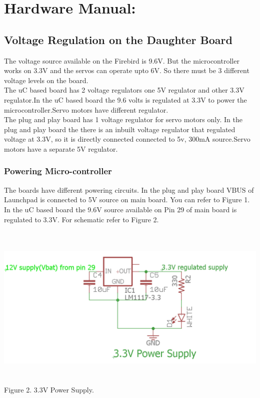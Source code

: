\documentclass[a4paper,10pt,oneside]{article}
\begin{document}
{		
		
	\section{\textbf{Hardware Manual:}}
	\subsection{\textbf{Voltage Regulation on the Daughter Board}}
	{The voltage source available on the Firebird is 9.6V. But the microcontroller works on 3.3V and the servos can operate upto 6V. So there must be 3 different voltage levels on the board. \\
	The uC based board has 2 voltage regulators one 5V regulator and other 3.3V regulator.In the uC based board the 9.6 volts is regulated at 3.3V to power the microcontroller.Servo motors have different regulator.\\
	The plug and play board has 1 voltage regulator for servo motors only. In the plug and play board the there is an inbuilt voltage regulator that regulated voltage at 3.3V, so it is directly connected connected to 5v, 300mA source.Servo motors have a separate 5V regulator.}
	\subsubsection{\textbf{Powering Micro-controller}}
	{The boards have different powering circuits. In the plug and play board VBUS of Launchpad is connected to 5V source on main board. You can refer to Figure 1.\\
	 In the uC based board the 9.6V source available on Pin 29 of main board is regulated to 3.3V. For schematic refer to Figure 2.} 
	\begin{center}	
	\includegraphics[width=18cm, height=8cm]{Images/3VPowerSupply}
	Figure 2. 3.3V Power Supply.
	\end{center}
}
\end{document}
